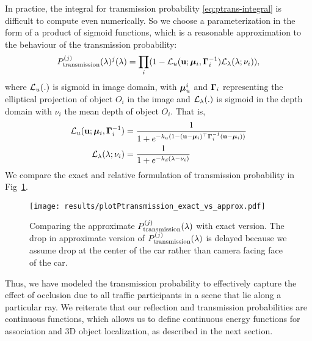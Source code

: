 In practice, the integral for transmission probability \eqref{eq:ptrans-integral} is difficult to compute even numerically. So we choose a parameterization in the form of a product of sigmoid functions, which is a reasonable approximation to the behaviour of the transmission probability:
%
\begin{align}
  P^{(j)}_{\text{transmission}}(\lambda)^j(\lambda) = \prod_i (1 - \mathcal{L}_u (\mathbf{u}; {\bm{\mu}}_i, \bm{\Gamma}_i^{-1}) \mathcal{L}_{\lambda}(\lambda; \nu_i)),
\label{eq:evalCumulativePtrans}
\end{align}
%
where $\mathcal{L}_u(.)$ is sigmoid in image domain, with ${\bm{\mu}}^i_u$ and $\bm{\Gamma}_i$ representing the elliptical projection of object $O_i$ in the image and $\mathcal{L}_{\lambda}(.)$ is sigmoid in the depth domain with $\nu_i$ the mean depth of object $O_i$. That is,
%
\begin{align}
\mathcal{L}_u(\mathbf{u}; {\bm{\mu}}_i, \bm{\Gamma}_i^{-1}) &= \frac{1}{1 + e^{-k_u(1 - (\mathbf{u} - {\bm{\mu}}_i)^\top \bm{\Gamma}_i^{-1} (\mathbf{u} - {\bm{\mu}}_i))}} \\
\mathcal{L}_{\lambda}(\lambda; \nu_i) &= \frac{1}{1 + e^{-k_d(\lambda - \nu_i)}}
\end{align}
%
We compare the exact and relative formulation of transmission probability in Fig~\ref{fig:compare:exact:approx:ptrans}.

\begin{figure}
  \texttt{[image: results/plotPtransmission\_exact\_vs\_approx.pdf]}
  \caption{Comparing the approximate $P^{(j)}_{\text{transmission}}(\lambda)$ with exact version. The drop in approximate version of $P^{(j)}_{\text{transmission}}(\lambda)$ is delayed because we assume drop at the center of the car rather than camera facing face of the car.}
  \label{fig:compare:exact:approx:ptrans}
\end{figure}

Thus, we have modeled the transmission probability to effectively capture the effect of occlusion due to all traffic participants in a scene that lie along a particular ray. We reiterate that our reflection and transmission probabilities are continuous functions, which allows us to define continuous energy functions for association and 3D object localization, as described in the next section.




